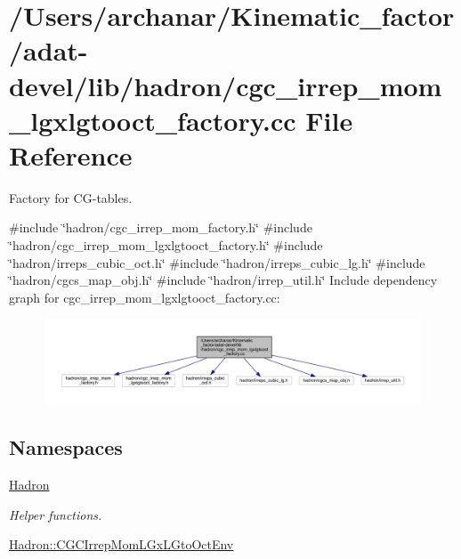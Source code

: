 \hypertarget{adat-devel_2lib_2hadron_2cgc__irrep__mom__lgxlgtooct__factory_8cc}{}\section{/\+Users/archanar/\+Kinematic\+\_\+factor/adat-\/devel/lib/hadron/cgc\+\_\+irrep\+\_\+mom\+\_\+lgxlgtooct\+\_\+factory.cc File Reference}
\label{adat-devel_2lib_2hadron_2cgc__irrep__mom__lgxlgtooct__factory_8cc}


Factory for C\+G-\/tables.  


{\ttfamily \#include \char`\"{}hadron/cgc\+\_\+irrep\+\_\+mom\+\_\+factory.\+h\char`\"{}}\newline
{\ttfamily \#include \char`\"{}hadron/cgc\+\_\+irrep\+\_\+mom\+\_\+lgxlgtooct\+\_\+factory.\+h\char`\"{}}\newline
{\ttfamily \#include \char`\"{}hadron/irreps\+\_\+cubic\+\_\+oct.\+h\char`\"{}}\newline
{\ttfamily \#include \char`\"{}hadron/irreps\+\_\+cubic\+\_\+lg.\+h\char`\"{}}\newline
{\ttfamily \#include \char`\"{}hadron/cgcs\+\_\+map\+\_\+obj.\+h\char`\"{}}\newline
{\ttfamily \#include \char`\"{}hadron/irrep\+\_\+util.\+h\char`\"{}}\newline
Include dependency graph for cgc\+\_\+irrep\+\_\+mom\+\_\+lgxlgtooct\+\_\+factory.\+cc\+:
\nopagebreak
\begin{figure}[H]
\begin{center}
\leavevmode
\includegraphics[width=350pt]{d6/dae/adat-devel_2lib_2hadron_2cgc__irrep__mom__lgxlgtooct__factory_8cc__incl}
\end{center}
\end{figure}
\subsection*{Namespaces}
\begin{DoxyCompactItemize}
\item 
 \mbox{\hyperlink{namespaceHadron}{Hadron}}
\begin{DoxyCompactList}\small\item\em Helper functions. \end{DoxyCompactList}\item 
 \mbox{\hyperlink{namespaceHadron_1_1CGCIrrepMomLGxLGtoOctEnv}{Hadron\+::\+C\+G\+C\+Irrep\+Mom\+L\+Gx\+L\+Gto\+Oct\+Env}}
\end{DoxyCompactItemize}
